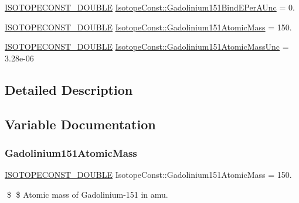 \begin{DoxyCompactItemize}
\item 
\mbox{\hyperlink{group___isotope_const-_macros_ga8f45a7272ce02c0b4c65c44636ed719a}{I\+S\+O\+T\+O\+P\+E\+C\+O\+N\+S\+T\+\_\+\+D\+O\+U\+B\+LE}} \mbox{\hyperlink{group___isotope_const-_gadolinium-_gd151_ga362ec2ac9a7f07f0e3430e25f55f844c}{Isotope\+Const\+::\+Gadolinium151\+Bind\+E\+Per\+A\+Unc}} = 0.
\item 
\mbox{\hyperlink{group___isotope_const-_macros_ga8f45a7272ce02c0b4c65c44636ed719a}{I\+S\+O\+T\+O\+P\+E\+C\+O\+N\+S\+T\+\_\+\+D\+O\+U\+B\+LE}} \mbox{\hyperlink{group___isotope_const-_gadolinium-_gd151_ga4b5d77ea452ea465db332a7d4fda2eba}{Isotope\+Const\+::\+Gadolinium151\+Atomic\+Mass}} = 150.
\item 
\mbox{\hyperlink{group___isotope_const-_macros_ga8f45a7272ce02c0b4c65c44636ed719a}{I\+S\+O\+T\+O\+P\+E\+C\+O\+N\+S\+T\+\_\+\+D\+O\+U\+B\+LE}} \mbox{\hyperlink{group___isotope_const-_gadolinium-_gd151_ga9bb2cc1282a3146fc59246295f242c5c}{Isotope\+Const\+::\+Gadolinium151\+Atomic\+Mass\+Unc}} = 3.\+28e-\/06
\end{DoxyCompactItemize}


\subsection{Detailed Description}


\subsection{Variable Documentation}
\mbox{\label{group___isotope_const-_gadolinium-_gd151_ga4b5d77ea452ea465db332a7d4fda2eba}} 
\subsubsection{\texorpdfstring{Gadolinium151\+Atomic\+Mass}{Gadolinium151AtomicMass}}
{\footnotesize\ttfamily \mbox{\hyperlink{group___isotope_const-_macros_ga8f45a7272ce02c0b4c65c44636ed719a}{I\+S\+O\+T\+O\+P\+E\+C\+O\+N\+S\+T\+\_\+\+D\+O\+U\+B\+LE}} Isotope\+Const\+::\+Gadolinium151\+Atomic\+Mass = 150.}

\$ \$ Atomic mass of Gadolinium-\/151 in amu. \mbox{\label{group___isotope_const-_gadolinium-_gd151_ga9bb2cc1282a3146fc59246295f242c5c}} 

